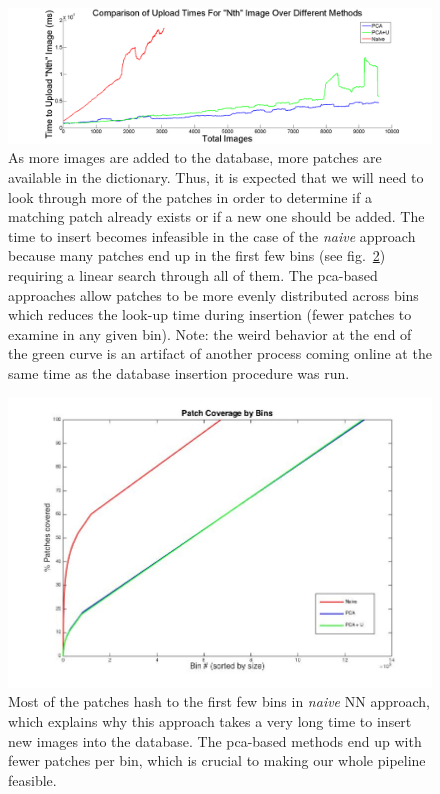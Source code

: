  \begin{figure}
\hspace{-10mm}
\includegraphics[width=1.2\linewidth]{Figures/upload_times.png}
\caption{As more images are added to the database, more patches are available in the dictionary. Thus, it is expected that we will need to look through more of the patches in order to determine if a matching patch already exists or if a new one should be added. The time to insert becomes infeasible in the case of the \emph{naive} approach because many patches end up in the first few bins (see fig.~\ref{fig:bin_cover}) requiring a linear search through all of them. The pca-based approaches allow patches to be more evenly distributed across bins which reduces the look-up time during insertion (fewer patches to examine in any given bin). Note: the weird behavior at the end of the green curve is an artifact of another process coming online at the same time as the database insertion procedure was run.}
\label{fig:upload_times}
\end{figure}

 \begin{figure}
\includegraphics[width=1\linewidth]{fig_NN/bin_cover.jpg}
\caption{Most of the patches hash to the first few bins in \emph{naive} NN approach, which explains why this approach takes a very long time to insert new images into the database. The pca-based methods end up with fewer patches per bin, which is crucial to making our whole pipeline feasible.}
\label{fig:bin_cover}
\end{figure}

